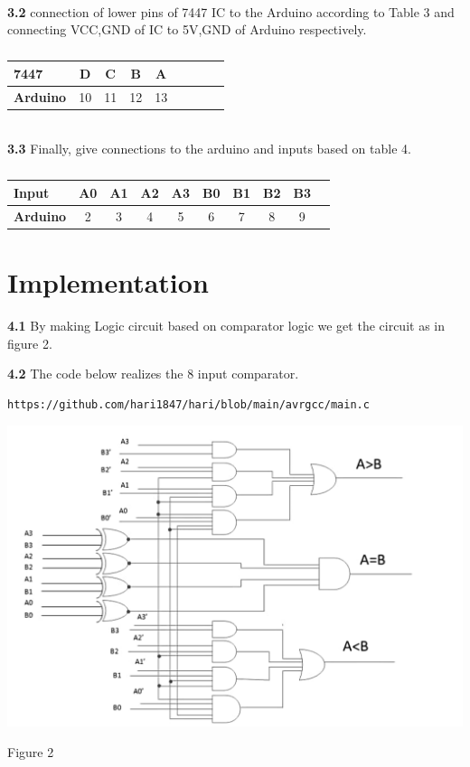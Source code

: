 \documentclass[10pt, a4paper]{article}
\begin{document}
\\	\textbf{3.2}
	connection of lower pins of 7447 IC to the Arduino according to Table 3 and connecting VCC,GND of IC to 5V,GND of Arduino respectively.
		\begin{table}[htbp]
    \begin{center}
    \begin{tabular}{|l|c|c|c|c|c|c|c|c} \hline \textbf{7447}
  & D & C & B & A \\
 \hline
\textbf{Arduino} & 10 & 11 & 12& 13\\ \hline
\end{tabular}   
\end{center}
\caption{\label{table:dummytable} }
\end{table}
\\\textbf{3.3}
Finally, give connections to the arduino and inputs based on table 4.
	\begin{table}[htbp]
    \begin{center}
    \begin{tabular}{|l|c|c|c|c|c|c|c|c|c|} \hline 
 
\textbf{Input} & A0 & A1 & A2 & A3 & B0 & B1 & B2&B3 \\ \hline
\textbf{Arduino} & 2 & 3 & 4 & 5& 6 & 7 & 8 & 9\\ \hline
\end{tabular}   
\end{center}
\caption{\label{table:dummytable} }
\end{table}
\section{Implementation}
\textbf{4.1}
By making Logic circuit based on comparator logic we get the circuit as in figure 2.

\textbf{4.2}
The code below realizes the 8 input comparator.
\begin{lstlisting}
https://github.com/hari1847/hari/blob/main/avrgcc/main.c
\end{lstlisting}



 \begin{center}
\includegraphics[scale=.10]{circuit.jpeg}

\end{center}
\begin{center}
    Figure 2
\end{center}
\end{document}

